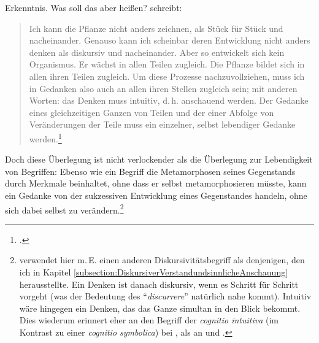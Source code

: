 Erkenntnis. Was soll das aber heißen?
 schreibt:
\begin{quote}
Ich kann die Pflanze nicht anders zeichnen, als Stück für Stück und
nacheinander. Genauso kann ich scheinbar deren Entwicklung nicht anders denken
als diskursiv und nacheinander. Aber so entwickelt sich kein Organismus. Er
wächst in allen Teilen zugleich. {\punkt} Die Pflanze bildet sich in allen ihren
Teilen zugleich. Um diese Prozesse nachzuvollziehen, muss ich in Gedanken also
auch an allen ihren Stellen zugleich sein; mit anderen Worten: das Denken muss
intuitiv, d.\,h. anschauend werden. Der Gedanke eines gleichzeitigen Ganzen von
Teilen und der einer Abfolge von Veränderungen der Teile muss ein einzelner,
selbst lebendiger Gedanke
werden.\footnote{\cite[][\pno~184\,f.]{Foerster:DieBedeutungvonSS7677deremphKritikderUrteilskraftfuerdieEntwicklungdernachkantischenPhilosophieTeil12002}.}
\end{quote}
Doch diese Überlegung ist nicht verlockender als die Überlegung zur Lebendigkeit
von Begriffen: Ebenso wie ein Begriff die Metamorphosen seines Gegenstands durch
Merkmale beinhaltet, ohne dass er selbst metamorphosieren müsste, kann ein Gedanke von
der sukzessiven Entwicklung eines Gegenstandes handeln, ohne sich dabei selbst
zu verändern.\footnote{ verwendet hier m.\,E.
einen anderen Diskursivitätsbegriff als denjenigen, den ich in Kapitel
\ref{subsection:DiskursiverVerstandundsinnlicheAnschauung} herausstellte. Ein
Denken ist danach diskursiv, wenn es Schritt für Schritt vorgeht (was der
Bedeutung des \enquote{\emph{discurrere}} natürlich nahe kommt). Intuitiv wäre
hingegen ein Denken, das das Ganze simultan in den Blick bekommt. Dies wiederum
erinnert eher an den Begriff der \emph{cognitio intuitiva} (im Kontrast zu
einer \emph{cognitio symbolica}) bei
\textcite[vgl.][585--588]{Leibniz:Meditationesdecognitioneveritateetideis1999}, als an
 und .}

